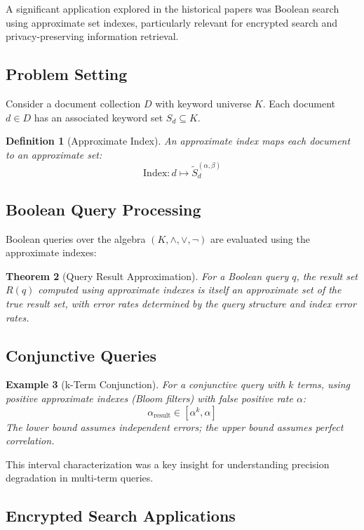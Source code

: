 \documentclass[11pt]{article}
\newtheorem{theorem}{Theorem}[section]
\newtheorem{definition}[theorem]{Definition}
\newtheorem{example}[theorem]{Example}
\newcommand{\observed}[1]{\tilde{#1}}  %
\newcommand{\fprate}{\alpha}  %
\newcommand{\fnrate}{\beta}   %
\begin{document}
A significant application explored in the historical papers was Boolean search using approximate set indexes, particularly relevant for encrypted search and privacy-preserving information retrieval.

\subsection{Problem Setting}

Consider a document collection $D$ with keyword universe $K$. Each document $d \in D$ has an associated keyword set $S_d \subseteq K$.

\begin{definition}[Approximate Index]
An approximate index maps each document to an approximate set:
$$\text{Index}: d \mapsto \observed{S}_d^{(\fprate, \fnrate)}$$
\end{definition}

\subsection{Boolean Query Processing}

Boolean queries over the algebra $(K, \land, \lor, \neg)$ are evaluated using the approximate indexes:

\begin{theorem}[Query Result Approximation]
For a Boolean query $q$, the result set $R(q)$ computed using approximate indexes is itself an approximate set of the true result set, with error rates determined by the query structure and index error rates.
\end{theorem}

\subsection{Conjunctive Queries}

\begin{example}[k-Term Conjunction]
For a conjunctive query with $k$ terms, using positive approximate indexes (Bloom filters) with false positive rate $\fprate$:
$$\fprate_{\text{result}} \in [\fprate^k, \fprate]$$
The lower bound assumes independent errors; the upper bound assumes perfect correlation.
\end{example}

This interval characterization was a key insight for understanding precision degradation in multi-term queries.

\subsection{Encrypted Search Applications}
\end{document}

